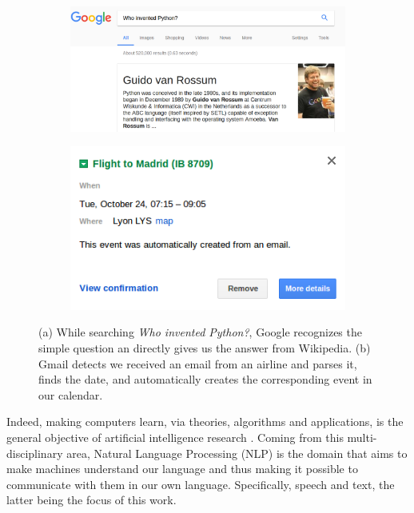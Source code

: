 \begin{figure}[t]
\centering
	\begin{subfigure}[b]{0.55\textwidth}
	\includegraphics[width=1\linewidth]{./images/Chapitre1/guido_google.png}
	\caption{}
\end{subfigure}

	\begin{subfigure}[b]{0.55\textwidth}
	\includegraphics[width=1\linewidth]{./images/Chapitre1/calendar2.png}
	\caption{}
\end{subfigure}
\caption{(a) While searching \textit{Who invented Python?}, Google recognizes the simple question an directly gives us the answer from Wikipedia. (b) Gmail detects we received an email from an airline and parses it, finds the date, and automatically creates the corresponding event in our calendar.}	
\label{fig:google_nlp}
\end{figure}
%
Indeed, making computers learn,  via theories, algorithms and applications, is the general objective of artificial intelligence  research \cite{Sugiyama2015}. Coming from this multi-disciplinary area, Natural Language Processing (NLP)  is the domain that aims to make machines understand our language \cite{JurafskyM09} and thus making it possible to communicate with them in our own language. Specifically, speech and text, the latter being the focus of this work.

